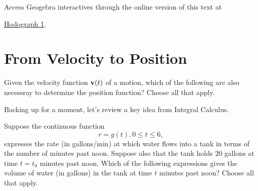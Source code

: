 \documentclass{ximera}
\begin{document}
\begin{exploration}
\begin{onlineOnly}
    \begin{center}
\end{center}
\end{onlineOnly}


Access Geogebra interactives through the online version of this text at

 
\href{https://www.geogebra.org/classic/jdsf9ttr}{Hodograph 1}.

\end{exploration}




\begin{exploration}
 
\begin{onlineOnly}
    \begin{center}
\end{center}
\end{onlineOnly}
\end{exploration}


\section{From Velocity to Position}


\begin{question}  \label{Qdst65nvcy}
Given the velocity function ${\bf v}(t)$ of a motion, which of the following are also necessray to determine the position function? Choose all that apply.
\begin{selectAll}  
  \end{selectAll}
\end{question}


Backing up for a moment, let's review a key idea from Integral Calculus.
\begin{question}  \label{Qddggt5t6vcy}
Suppose the continuous function 
\[
    r=g(t) , 0\leq t \leq 6 ,
\]
expresses the rate (in gallons/min) at which water flows into a tank in terms of the number of minutes past noon. Suppose also that the tank holds $20$ gallons at time $t=t_0$ minutes past noon. Which of the following expressions gives the volume of water (in gallons) in the tank at time $t$ minutes past noon? Choose all that apply.
\begin{selectAll}  
  \end{selectAll}
\end{question}
\end{document}
